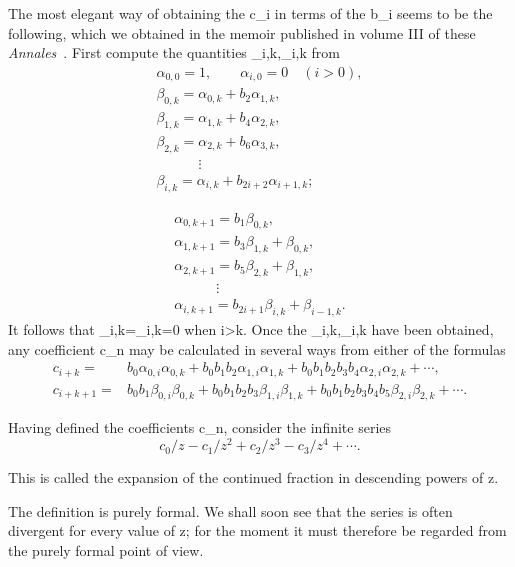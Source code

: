 \documentclass[
  paper=b5,
  fontsize=13pt,
  twoside,
  headings=normal,
  bookmarkpackage=false
]{scrartcl}
\theoremstyle{stieltjesplain}
\theoremstyle{stieltjesdefinition}
\def\({}\def\){}%
\def\frac#1#2{#1/#2}%
\begin{document}
The most elegant way of obtaining the \(c_i\) in terms of the \(b_i\)
seems to be the following, which we obtained in the memoir published in
volume III of these \emph{Annales}~\cite{Stieltjes1889}. First compute the quantities
\(\alpha_{i,k},\beta_{i,k}\) from
\begin{gather*}
 \alpha_{0,0}=1,\qquad \alpha_{i,0}=0\quad(i>0),\\
 \beta_{0,k}=\alpha_{0,k}+b_2\alpha_{1,k},\\
 \beta_{1,k}=\alpha_{1,k}+b_4\alpha_{2,k},\\
 \beta_{2,k}=\alpha_{2,k}+b_6\alpha_{3,k},\\
 \hspace{3em}\vdots\\
 \beta_{i,k}=\alpha_{i,k}+b_{2i+2}\alpha_{i+1,k};
\end{gather*}

\begin{gather*}
 \alpha_{0,k+1}=b_1\beta_{0,k},\\
 \alpha_{1,k+1}=b_3\beta_{1,k}+\beta_{0,k},\\
 \alpha_{2,k+1}=b_5\beta_{2,k}+\beta_{1,k},\\
 \hspace{3em}\vdots\\
 \alpha_{i,k+1}=b_{2i+1}\beta_{i,k}+\beta_{i-1,k}.
\end{gather*}
It follows that \(\alpha_{i,k}=\beta_{i,k}=0\) when \(i>k\). Once the
\(\alpha_{i,k},\beta_{i,k}\) have been obtained, any coefficient \(c_n\)
may be calculated in several ways from either of the formulas
\begin{align*}
 c_{i+k}={}&b_0\alpha_{0,i}\alpha_{0,k}
  +b_0b_1b_2\alpha_{1,i}\alpha_{1,k}
  +b_0b_1b_2b_3b_4\alpha_{2,i}\alpha_{2,k}+\cdots,\\
 c_{i+k+1}={}&b_0b_1\beta_{0,i}\beta_{0,k}
  +b_0b_1b_2b_3\beta_{1,i}\beta_{1,k}
  +b_0b_1b_2b_3b_4b_5\beta_{2,i}\beta_{2,k}+\cdots.
\end{align*}

Having defined the coefficients \(c_n\), consider the infinite series
\label{eq:s7-formal-series}
\begin{equation*}
 \frac{c_0}{z}-\frac{c_1}{z^2}+\frac{c_2}{z^3}
 -\frac{c_3}{z^4}+\cdots.
\end{equation*}
\begin{definition}
This is called the expansion of the continued fraction in descending
powers of \(z\).
\end{definition}
The definition is purely formal. We shall soon see that the series is
often divergent for every value of \(z\); for the moment it must therefore
be regarded from the purely formal point of view.
\end{document}
